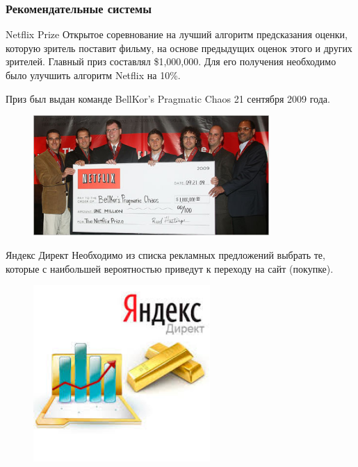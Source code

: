 \documentclass{beamer}
\begin{document}
\subsubsection{Рекомендательные системы}
\begin{frame}{Netflix Prize}
    Открытое соревнование на лучший алгоритм предсказания оценки, которую зритель поставит фильму, на основе предыдущих оценок этого и других зрителей. Главный приз составлял \$1,000,000. Для его получения необходимо было улучшить алгоритм Netflix на 10\%.

    Приз был выдан команде BellKor’s Pragmatic Chaos 21 сентября 2009 года.
    \begin{figure}
        \includegraphics[width=0.8\textwidth]{fig/netflix.jpg}
    \end{figure}
\end{frame}

\begin{frame}{Яндекс Директ}
    Необходимо из списка рекламных предложений выбрать те, которые с наибольшей вероятностью приведут к переходу на сайт (покупке).
    \begin{figure}
        \includegraphics[width=0.6\textwidth]{fig/yandex_direct.jpg}
    \end{figure}
\end{frame}
\end{document}
